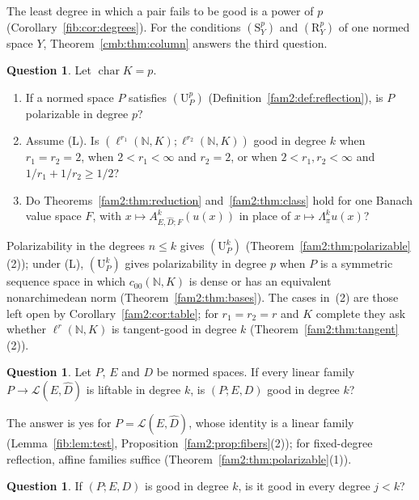 \documentclass[11pt]{amsart}
\theoremstyle{definition}
\theoremstyle{remark}
\numberwithin{equation}{section}
\newcommand{\N}{\mathbb N}
\newcommand{\cL}{\mathcal L}
\theoremstyle{plain}
\theoremstyle{definition}
\newtheorem{question}[theorem]{Question}
\theoremstyle{plain}
\begin{document}
The least degree in which a pair fails to be good is a power of $p$ (Corollary~\ref{fib:cor:degrees}). For the
conditions $(\mathrm S^p_Y)$ and $(\mathrm R^p_Y)$ of one normed space $Y$, Theorem~\ref{cmb:thm:column} answers the third question.

\begin{question}\label{q:quest:pairs}
Let $\operatorname{char}K=p$.
\begin{enumerate}
\item If a normed space $P$ satisfies $(\mathrm U^p_P)$ (Definition~\ref{fam2:def:reflection}), is $P$ polarizable in
degree $p$?
\item Assume \textup{(L)}. Is $(\ell^{r_1}(\N,K);\ell^{r_2}(\N,K))$ good in degree $k$ when $r_1=r_2=2$, when
$2<r_1<\infty$ and $r_2=2$, or when $2<r_1,r_2<\infty$ and $1/r_1+1/r_2\ge1/2$?
\item Do Theorems~\ref{fam2:thm:reduction} and~\ref{fam2:thm:class} hold for one Banach value space $F$, with
$x\mapsto A^k_{E,\widehat D;F}(u(x))$ in place of $x\mapsto\Lambda^k_\pi u(x)$?
\end{enumerate}
\end{question}

Polarizability in the degrees $n\le k$ gives $(\mathrm U^k_P)$ (Theorem~\ref{fam2:thm:polarizable}(2)); under
\textup{(L)}, $(\mathrm U^k_P)$ gives polarizability in degree $p$ when $P$ is a symmetric sequence space in which
$c_{00}(\N,K)$ is dense or has an equivalent nonarchimedean norm (Theorem~\ref{fam2:thm:bases}). The cases in~(2) are those left open by
Corollary~\ref{fam2:cor:table}; for $r_1=r_2=r$ and $K$ complete they ask whether $\ell^r(\N,K)$ is tangent-good in
degree $k$ (Theorem~\ref{fam2:thm:tangent}(2)).

\begin{question}\label{q:quest:linear-families}
Let $P$, $E$ and $D$ be normed spaces. If every linear family $P\to\cL(E,\widehat D)$ is liftable in degree $k$, is
$(P;E,D)$ good in degree $k$?
\end{question}

The answer is yes for $P=\cL(E,\widehat D)$, whose identity is a linear family (Lemma~\ref{fib:lem:test},
Proposition~\ref{fam2:prop:fibers}(2)); for fixed-degree reflection, affine families suffice
(Theorem~\ref{fam2:thm:polarizable}(1)).

\begin{question}\label{q:quest:lower-degrees}
If $(P;E,D)$ is good in degree $k$, is it good in every degree $j<k$?
\end{question}
\end{document}
